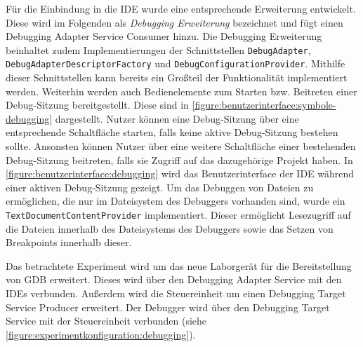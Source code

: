 Für die Einbindung in die IDE wurde eine entsprechende Erweiterung entwickelt. Diese wird im Folgenden als \textit{Debugging Erweiterung} bezeichnet und fügt einen Debugging Adapter Service Consumer hinzu. Die Debugging Erweiterung beinhaltet zudem Implementierungen der Schnittstellen \texttt{DebugAdapter}, \texttt{DebugAdapterDescriptorFactory} und \texttt{DebugConfigurationProvider}. Mithilfe dieser Schnittstellen kann bereits ein Großteil der Funktionalität implementiert werden. Weiterhin werden auch Bedienelemente zum Starten bzw. Beitreten einer Debug-Sitzung bereitgestellt. Diese sind in \autoref{figure:benutzerinterface:symbole-debugging} dargestellt. Nutzer können eine Debug-Sitzung über eine entsprechende Schaltfläche starten, falls keine aktive Debug-Sitzung bestehen sollte. Ansonsten können Nutzer über eine weitere Schaltfläche einer bestehenden Debug-Sitzung beitreten, falls sie Zugriff auf das dazugehörige Projekt haben. In \autoref{figure:benutzerinterface:debugging} wird das Benutzerinterface der IDE während einer aktiven Debug-Sitzung gezeigt. Um das Debuggen von Dateien zu ermöglichen, die nur im Dateisystem des Debuggers vorhanden sind, wurde ein \texttt{TextDocumentContentProvider} implementiert. Dieser ermöglicht Lesezugriff auf die Dateien innerhalb des Dateisystems des Debuggers sowie das Setzen von Breakpoints innerhalb dieser.

Das betrachtete Experiment wird um das neue Laborgerät für die Bereitstellung von GDB erweitert. Dieses wird über den Debugging Adapter Service mit den IDEs verbunden. Außerdem wird die Steuereinheit um einen Debugging Target Service Producer erweitert. Der Debugger wird über den Debugging Target Service mit der Steuereinheit verbunden (siehe \autoref{figure:experimentkonfiguration:debugging}).